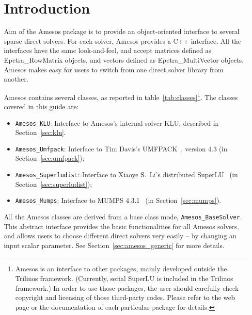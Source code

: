 \documentclass[11pt]{SANDreport}
\begin{document}
\smallskip


\smallskip


\clearpage

\section{Introduction}

Aim of the Amesos package is to provide an object-oriented interface to
several sparse direct solvers. For each solver, Amesos provides a C++
interface. All the interfaces have the same look-and-feel, and accept
matrices defined as Epetra\_RowMatrix objects, and vectors defined as
Epetra\_MultiVector objects. Amesos makes easy for users to switch from
one direct solver library from another.

Amesos contains several classes, as reported in
table~\ref{tab:classes}\footnote{Amesos is an interface to other
  packages, mainly developed outside the Trilinos framework. (Currently,
  serial SuperLU is included in the Trilinos framework.) In order to use
  those packages, the user should carefully check copyright and
  licensing of those third-party codes.  Please refer to the web page or
  the documentation of each particular package for details.}.  The
classes covered in this guide are:
\begin{itemize}
\item \verb!Amesos_KLU!: Interface to Amesos's internal solver
  KLU, described in Section~\ref{sec:klu}.
\item \verb!Amesos_Umfpack!: Interface to Tim Davis's
  UMFPACK~\cite{umfpack-home-page}, version 4.3 (in Section~\ref{sec:umfpack});
\item \verb!Amesos_Superludist!: Interface to Xiaoye S.~Li's distributed
  SuperLU~\cite{superlu-home-page} (in Section~\ref{sec:superludist});
\item \verb!Amesos_Mumps!: Interface to MUMPS
  4.3.1~\cite{mumps-home-page} (in Section~\ref{sec:mumps}).
\end{itemize}

All the Amesos classes are derived from a base class mode,
\verb!Amesos_BaseSolver!. This abstract interface provides the basic
functionalities for all Amesos solvers, and allows users to choose
different direct solvers very easily -- by changing an input scalar
parameter. See Section~\ref{sec:amesos_generic} for more details.
\end{document}
